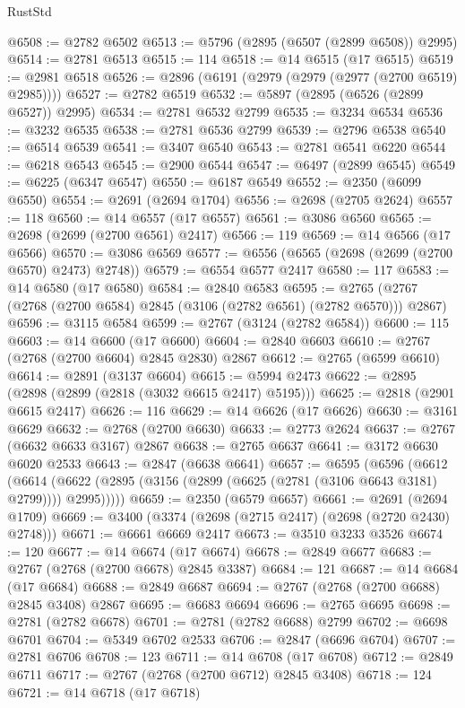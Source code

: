 \begin{lexlean}{RustStd}
\begin{coremodule}
@6508 := @2782 @6502
@6513 := @5796 (@2895 (@6507 (@2899 @6508)) @2995)
@6514 := @2781 @6513
@6515 := 114
@6518 := @14 @6515 (@17 @6515)
@6519 := @2981 @6518
@6526 := @2896 (@6191 (@2979 (@2979 (@2977 (@2700 @6519) @2985))))
@6527 := @2782 @6519
@6532 := @5897 (@2895 (@6526 (@2899 @6527)) @2995)
@6534 := @2781 @6532 @2799
@6535 := @3234 @6534
@6536 := @3232 @6535
@6538 := @2781 @6536 @2799
@6539 := @2796 @6538
@6540 := @6514 @6539
@6541 := @3407 @6540
@6543 := @2781 @6541 @6220
@6544 := @6218 @6543
@6545 := @2900 @6544
@6547 := @6497 (@2899 @6545)
@6549 := @6225 (@6347 @6547)
@6550 := @6187 @6549
@6552 := @2350 (@6099 @6550)
@6554 := @2691 (@2694 @1704)
@6556 := @2698 (@2705 @2624)
@6557 := 118
@6560 := @14 @6557 (@17 @6557)
@6561 := @3086 @6560
@6565 := @2698 (@2699 (@2700 @6561) @2417)
@6566 := 119
@6569 := @14 @6566 (@17 @6566)
@6570 := @3086 @6569
@6577 := @6556 (@6565 (@2698 (@2699 (@2700 @6570) @2473) @2748))
@6579 := @6554 @6577 @2417
@6580 := 117
@6583 := @14 @6580 (@17 @6580)
@6584 := @2840 @6583
@6595 := @2765 (@2767 (@2768 (@2700 @6584) @2845 (@3106 (@2782 @6561) (@2782 @6570))) @2867)
@6596 := @3115 @6584
@6599 := @2767 (@3124 (@2782 @6584))
@6600 := 115
@6603 := @14 @6600 (@17 @6600)
@6604 := @2840 @6603
@6610 := @2767 (@2768 (@2700 @6604) @2845 @2830) @2867
@6612 := @2765 (@6599 @6610)
@6614 := @2891 (@3137 @6604)
@6615 := @5994 @2473
@6622 := @2895 (@2898 (@2899 (@2818 (@3032 @6615 @2417) @5195)))
@6625 := @2818 (@2901 @6615 @2417)
@6626 := 116
@6629 := @14 @6626 (@17 @6626)
@6630 := @3161 @6629
@6632 := @2768 (@2700 @6630)
@6633 := @2773 @2624
@6637 := @2767 (@6632 @6633 @3167) @2867
@6638 := @2765 @6637
@6641 := @3172 @6630 @6020 @2533
@6643 := @2847 (@6638 @6641)
@6657 := @6595
    (@6596
      (@6612
        (@6614 (@6622 (@2895 (@3156 (@2899 (@6625 (@2781 (@3106 @6643 @3181) @2799)))) @2995)))))
@6659 := @2350 (@6579 @6657)
@6661 := @2691 (@2694 @1709)
@6669 := @3400 (@3374 (@2698 (@2715 @2417) (@2698 (@2720 @2430) @2748)))
@6671 := @6661 @6669 @2417
@6673 := @3510 @3233 @3526
@6674 := 120
@6677 := @14 @6674 (@17 @6674)
@6678 := @2849 @6677
@6683 := @2767 (@2768 (@2700 @6678) @2845 @3387)
@6684 := 121
@6687 := @14 @6684 (@17 @6684)
@6688 := @2849 @6687
@6694 := @2767 (@2768 (@2700 @6688) @2845 @3408) @2867
@6695 := @6683 @6694
@6696 := @2765 @6695
@6698 := @2781 (@2782 @6678)
@6701 := @2781 (@2782 @6688) @2799
@6702 := @6698 @6701
@6704 := @5349 @6702 @2533
@6706 := @2847 (@6696 @6704)
@6707 := @2781 @6706
@6708 := 123
@6711 := @14 @6708 (@17 @6708)
@6712 := @2849 @6711
@6717 := @2767 (@2768 (@2700 @6712) @2845 @3408)
@6718 := 124
@6721 := @14 @6718 (@17 @6718)

\end{coremodule}
\end{lexlean}
